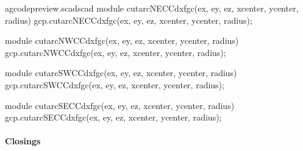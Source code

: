 \documentclass{ltxdoc}
\begin{document}
\lstset{firstnumber=\thegcpscad}
\begin{writecode}{a}{gcodepreview.scad}{scad}
module cutarcNECCdxfgc(ex, ey, ez, xcenter, ycenter, radius){
    gcp.cutarcNECCdxfgc(ex, ey, ez, xcenter, ycenter, radius);
}

module cutarcNWCCdxfgc(ex, ey, ez, xcenter, ycenter, radius){
    gcp.cutarcNWCCdxfgc(ex, ey, ez, xcenter, ycenter, radius);
}

module cutarcSWCCdxfgc(ex, ey, ez, xcenter, ycenter, radius){
    gcp.cutarcSWCCdxfgc(ex, ey, ez, xcenter, ycenter, radius);
}

module cutarcSECCdxfgc(ex, ey, ez, xcenter, ycenter, radius){
    gcp.cutarcSECCdxfgc(ex, ey, ez, xcenter, ycenter, radius);
}
\end{writecode}
\addtocounter{gcpscad}{16}

%


\paragraph{Closings}
\end{document}
